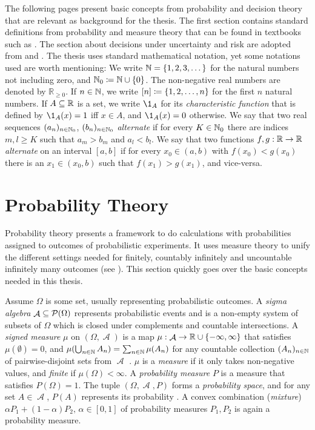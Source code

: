 \documentclass[a4paper,DIV=11,abstracton,twoside=semi]{scrreprt}
\DeclareMathOperator{\A}{\mathcal{A}}
\newcommand{\Rp}{\mathbb{R}_{\geq 0}}
\theoremstyle{definition}
\begin{document}
    The following pages present basic concepts from probability and decision theory that are relevant as background for the thesis.
    The first section contains standard definitions from probability and measure theory that can be found in textbooks such as \cite{bib:billingsleyProbabilityAndMeasure}.
    The section about decisions under uncertainty and risk are adopted from \cite[Sections 3.5 - 5.3]{bib:doersamGrundlagenDerEntscheidungstheorie} and \cite[Sections I.1, I.2]{bib:wakkerProspectTheory}.
    The thesis uses standard mathematical notation, yet some notations used are worth mentioning:
    We write $\mathbb{N} = \{1, 2, 3, \dots\}$ for the natural numbers not including zero, and $\mathbb{N}_0 \coloneqq \mathbb{N} \cup \{0\}$.
    The non-negative real numbers are denoted by $\Rp$. If $n \in \mathbb{N}$, we write $[n] \coloneqq \{1, 2, \dots, n\}$ for the first $n$ natural numbers.
    If $A \subseteq \mathbb{R}$ is a set, we write $\1_A$ for its \emph{characteristic function} that is defined by $\1_A(x) = 1$ iff $x \in A$, and $\1_A(x) = 0$ otherwise.
    We say that two real sequences $(a_n)_{n \in \mathbb{N}_0}$, $(b_n)_{n \in \mathbb{N}_0}$ \emph{alternate} if for every $K \in \mathbb{N}_0$ there are indices $m, l \geq K$ such that $a_m > b_m$ and $a_l < b_l$. We say that two functions $f, g: \mathbb{R} \to \mathbb{R}$ \emph{alternate} on an interval $[a, b]$ if for every $x_0 \in (a, b)$ with $f(x_0) < g(x_0)$ there is an $x_1 \in (x_0, b)$ such that $f(x_1) > g(x_1)$, and vice-versa.
    
    \section{Probability Theory}
    Probability theory presents a framework to do calculations with probabilities assigned to outcomes of probabilistic experiments. It uses measure theory to unify the different settings needed for finitely, countably infinitely and uncountable infinitely many outcomes (see \cite[Section 1]{bib:billingsleyProbabilityAndMeasure}). This section quickly goes over the basic concepts needed in this thesis.
    
    Assume $\Omega$ is some set, usually representing probabilistic outcomes. 
    A \emph{sigma algebra} $\A \subseteq \Pot(\Omega)$ represents probabilistic events and is a non-empty system of subsets of $\Omega$ which is closed under complements and countable intersections.
    A \emph{signed measure} $\mu$ on $(\Omega, \A)$ is a map $\mu: \A \to \R \cup \set{-\infty, \infty}$ that satisfies $\mu(\emptyset) = 0$, and $\mu(\bigcup_{n \in \mathbb{N}} A_n) = \sum_{n \in \mathbb{N}}\mu(A_n)$ for any countable collection $(A_n)_{n \in \mathbb{N}}$ of pairwise-disjoint sets from $\A$ \cite[Problem 32.12]{bib:billingsleyProbabilityAndMeasure}.
    $\mu$ is a \emph{measure} if it only takes non-negative values, and \emph{finite} if $\mu(\Omega) < \infty$.
    A \emph{probability measure} $P$ is a measure that satisfies $P(\Omega) = 1$.
    The tuple $(\Omega, \A, P)$ forms a \emph{probability space}, and for any set $A \in \A$, $P(A)$ represents its probability \cite[Section 2]{bib:billingsleyProbabilityAndMeasure}.
    A convex combination (\emph{mixture}) $\alpha P_1 + (1-\alpha) P_2,\, \alpha \in [0, 1]$ of probability measures $P_1, P_2$ is again a probability measure.
    
\end{document}
